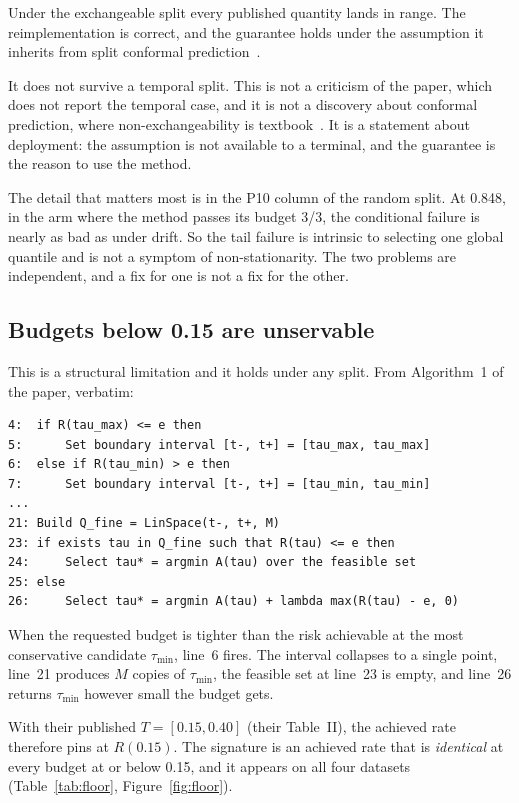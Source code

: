\documentclass[acmsmall,screen]{acmart}
\begin{document}
Under the exchangeable split every published quantity lands in range. The reimplementation is correct, and the guarantee holds under the assumption it inherits from split conformal prediction~\cite{vovk2005algorithmic}.

It does not survive a temporal split. This is not a criticism of the paper, which does not report the temporal case, and it is not a discovery about conformal prediction, where non-exchangeability is textbook~\cite{barber2023beyond}. It is a statement about deployment: the assumption is not available to a terminal, and the guarantee is the reason to use the method.

The detail that matters most is in the P10 column of the random split. At 0.848, in the arm where the method passes its budget 3/3, the conditional failure is nearly as bad as under drift. So the tail failure is intrinsic to selecting one global quantile and is not a symptom of non-stationarity. The two problems are independent, and a fix for one is not a fix for the other.

\subsection{Budgets below 0.15 are unservable}
\label{sec:floor}

This is a structural limitation and it holds under any split. From Algorithm~1 of the paper, verbatim:

\begin{verbatim}
4:  if R(tau_max) <= e then
5:      Set boundary interval [t-, t+] = [tau_max, tau_max]
6:  else if R(tau_min) > e then
7:      Set boundary interval [t-, t+] = [tau_min, tau_min]
...
21: Build Q_fine = LinSpace(t-, t+, M)
23: if exists tau in Q_fine such that R(tau) <= e then
24:     Select tau* = argmin A(tau) over the feasible set
25: else
26:     Select tau* = argmin A(tau) + lambda max(R(tau) - e, 0)
\end{verbatim}

When the requested budget is tighter than the risk achievable at the most conservative candidate $\tau_{\min}$, line~6 fires. The interval collapses to a single point, line~21 produces $M$ copies of $\tau_{\min}$, the feasible set at line~23 is empty, and line~26 returns $\tau_{\min}$ however small the budget gets.

With their published $T = [0.15, 0.40]$ (their Table~II), the achieved rate therefore pins at $R(0.15)$. The signature is an achieved rate that is \emph{identical} at every budget at or below 0.15, and it appears on all four datasets (Table~\ref{tab:floor}, Figure~\ref{fig:floor}).
\end{document}
